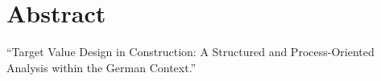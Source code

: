 \cleardoublepage
{}
\chapter*{Abstract}

“Target Value Design in Construction: A Structured and Process-Oriented Analysis within the German Context.”